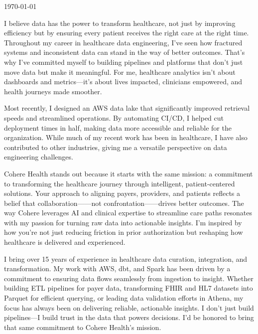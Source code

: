 \documentclass[11pt, letterpaper]{awesome-cv}
\begin{document}
\makecvheader[R]

\makecvfooter
  {}
  {}
  {\today}


\begin{cvletter}

I believe data has the power to transform healthcare, not just by improving efficiency but by ensuring every patient receives the right care at the right time. Throughout my career in healthcare data engineering, I’ve seen how fractured systems and inconsistent data can stand in the way of better outcomes. That’s why I’ve committed myself to building pipelines and platforms that don’t just move data but make it meaningful. For me, healthcare analytics isn’t about dashboards and metrics—it’s about lives impacted, clinicians empowered, and health journeys made smoother.

Most recently, I designed an AWS data lake that significantly improved retrieval speeds and streamlined operations. By automating CI/CD, I helped cut deployment times in half, making data more accessible and reliable for the organization. While much of my recent work has been in healthcare, I have also contributed to other industries, giving me a versatile perspective on data engineering challenges.

Cohere Health stands out because it starts with the same mission: a commitment to transforming the healthcare journey through intelligent, patient-centered solutions. Your approach to aligning payers, providers, and patients reflects a belief that collaboration——not confrontation——drives better outcomes. The way Cohere leverages AI and clinical expertise to streamline care paths resonates with my passion for turning raw data into actionable insights. I’m inspired by how you’re not just reducing friction in prior authorization but reshaping how healthcare is delivered and experienced.

I bring over 15 years of experience in healthcare data curation, integration, and transformation. My work with AWS, dbt, and Spark has been driven by a commitment to ensuring data flows seamlessly from ingestion to insight. Whether building ETL pipelines for payer data, transforming FHIR and HL7 datasets into Parquet for efficient querying, or leading data validation efforts in Athena, my focus has always been on delivering reliable, actionable insights. I don’t just build pipelines—I build trust in the data that powers decisions. I’d be honored to bring that same commitment to Cohere Health’s mission.  


\end{cvletter}
\end{document}
